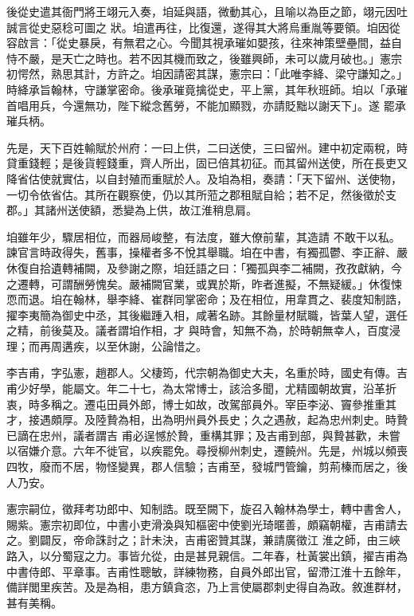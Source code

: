 \begin{pinyinscope}
 後從史遣其衙門將王翊元入奏，垍延與語，微動其心，且喻以為臣之節，翊元因吐誠言從史惡稔可圖之
 狀。垍遣再往，比復還，遂得其大將烏重胤等要領。垍因從容啟言：「從史暴戾，有無君之心。今聞其視承璀如嬰孩，往來神策壁壘間，益自恃不嚴，是天亡之時也。若不因其機而致之，後雖興師，未可以歲月破也。」憲宗初愕然，熟思其計，方許之。垍因請密其謀，憲宗曰：「此唯李絳、梁守謙知之。」時絳承旨翰林，守謙掌密命。後承璀竟擒從史，平上黨，其年秋班師。垍以「承璀首唱用兵，今還無功，陛下縱念舊勞，不能加顯戮，亦請貶黜以謝天下」。遂
 罷承璀兵柄。



 先是，天下百姓輸賦於州府：一曰上供，二曰送使，三曰留州。建中初定兩稅，時貸重錢輕；是後貨輕錢重，齊人所出，固已倍其初征。而其留州送使，所在長吏又降省估使就實估，以自封殖而重賦於人。及垍為相，奏請：「天下留州、送使物，一切令依省估。其所在觀察使，仍以其所蒞之郡租賦自給；若不足，然後徵於支郡。」其諸州送使額，悉變為上供，故江淮稍息肩。



 垍雖年少，驟居相位，而器局峻整，有法度，雖大僚前輩，其造請
 不敢干以私。諫官言時政得失，舊事，操權者多不悅其舉職。垍在中書，有獨孤鬱、李正辭、嚴休復自拾遺轉補闕，及參謝之際，垍廷語之曰：「獨孤與李二補闕，孜孜獻納，今之遷轉，可謂酬勞愧矣。嚴補闕官業，或異於斯，昨者進擬，不無疑緩。」休復悚恧而退。垍在翰林，舉李絳、崔群同掌密命；及在相位，用韋貫之、裴度知制誥，擢李夷簡為御史中丞，其後繼踵入相，咸著名跡。其餘量材賦職，皆葉人望，選任之精，前後莫及。議者謂垍作相，才
 與時會，知無不為，於時朝無幸人，百度浸理；而再周遘疾，以至休謝，公論惜之。



 李吉甫，字弘憲，趙郡人。父棲筠，代宗朝為御史大夫，名重於時，國史有傳。吉甫少好學，能屬文。年二十七，為太常博士，該洽多聞，尤精國朝故實，沿革折衷，時多稱之。遷屯田員外郎，博士如故，改駕部員外。宰臣李泌、竇參推重其才，接遇頗厚。及陸贄為相，出為明州員外長史；久之遇赦，起為忠州刺史。時贄已謫在忠州，議者謂吉
 甫必逞憾於贄，重構其罪；及吉甫到部，與贄甚歡，未嘗以宿嫌介意。六年不徙官，以疾罷免。尋授柳州刺史，遷饒州。先是，州城以頻喪四牧，廢而不居，物怪變異，郡人信驗；吉甫至，發城門管鑰，剪荊榛而居之，後人乃安。



 憲宗嗣位，徵拜考功郎中、知制誥。既至闕下，旋召入翰林為學士，轉中書舍人，賜紫。憲宗初即位，中書小吏滑渙與知樞密中使劉光琦暱善，頗竊朝權，吉甫請去之。劉闢反，帝命誅討之；計未決，吉甫密贊其謀，兼請廣徵江
 淮之師，由三峽路入，以分蜀寇之力。事皆允從，由是甚見親信。二年春，杜黃裳出鎮，擢吉甫為中書侍郎、平章事。吉甫性聰敏，詳練物務，自員外郎出官，留滯江淮十五餘年，備詳閭里疾苦。及是為相，患方鎮貪恣，乃上言使屬郡刺史得自為政。敘進群材，甚有美稱。




\end{pinyinscope}
